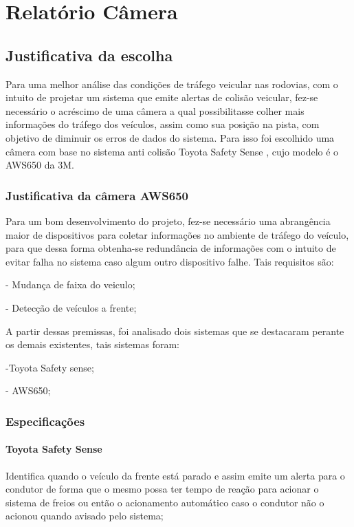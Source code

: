 \chapter[Relatório Câmera]{Relatório Câmera}

\section{Justificativa da escolha}

Para uma melhor análise das condições de tráfego veicular nas rodovias, com o
intuito de projetar um sistema que emite alertas de colisão veicular, fez-se
necessário o acréscimo de uma câmera a qual possibilitasse colher mais informações
do tráfego dos veículos, assim como sua posição na pista, com objetivo de
diminuir os erros de dados do sistema. Para isso foi escolhido uma câmera
com base no sistema anti colisão  Toyota Safety Sense \cite{toyota_safety}, cujo modelo é o AWS650 da 3M.

\subsection{Justificativa da câmera AWS650}

Para um bom desenvolvimento do projeto, fez-se necessário uma abrangência maior de dispositivos para coletar informações no ambiente de tráfego do veículo, para que dessa forma obtenha-se redundância de informações com o intuito de evitar falha no sistema  caso algum outro dispositivo falhe. Tais requisitos são:

-  Mudança de faixa do veiculo;

-  Detecção de veículos a frente;

A partir dessas premissas, foi analisado dois sistemas que se destacaram perante os demais existentes, tais sistemas foram:

-Toyota Safety sense;

- AWS650;

\subsection{Especificações}
\subsubsection{Toyota Safety Sense}

Identifica quando o veículo da frente está parado e assim emite um alerta para o condutor de forma que o mesmo possa ter tempo de reação para acionar o sistema de freios ou então o acionamento automático caso o condutor não o acionou quando avisado pelo sistema;

